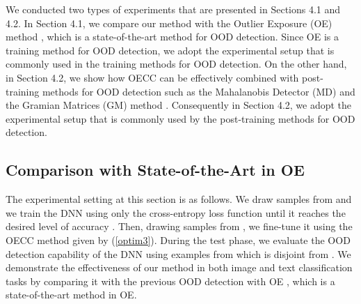 \documentclass{article} \usepackage{iclr2020_conference,times}
\begin{document}
We conducted two types of experiments that are presented in Sections 4.1 and 4.2. In Section 4.1, we compare our method with the Outlier Exposure (OE) method \citep{hendrycks2019oe}, which is a state-of-the-art method for OOD detection. Since OE is a training method for OOD detection, we adopt the experimental setup that is commonly used in the training methods for OOD detection. On the other hand, in Section 4.2, we show how OECC can be effectively combined with post-training methods for OOD detection such as the Mahalanobis Detector (MD) \citep{Lee:2018:SUF:3327757.3327819} and the Gramian Matrices (GM) method \citep{ch2019detecting}. Consequently in Section 4.2, we adopt the experimental setup that is commonly used by the post-training methods for OOD detection. 

\subsection{Comparison with State-of-the-Art in OE}
The experimental setting at this section is as follows. We draw samples from  and we train the DNN using only the cross-entropy loss function until it reaches the desired level of accuracy . Then, drawing samples from , we fine-tune it using the OECC method given by (\ref{optim3}). During the test phase, we evaluate the OOD detection capability of the DNN using examples from  which is disjoint from . We demonstrate the effectiveness of our method in both image and text classification tasks by comparing it with the previous OOD detection with OE \citep{hendrycks2019oe}, which is a state-of-the-art method in OE. 
\end{document}

